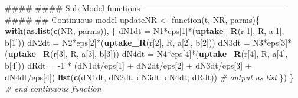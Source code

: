 \documentclass[11pt,]{article}
\newenvironment{Shaded}{\begin{snugshade}}{\end{snugshade}}
\newcommand{\KeywordTok}[1]{\textcolor[rgb]{0.13,0.29,0.53}{\textbf{{#1}}}}
\newcommand{\DecValTok}[1]{\textcolor[rgb]{0.00,0.00,0.81}{{#1}}}
\newcommand{\StringTok}[1]{\textcolor[rgb]{0.31,0.60,0.02}{{#1}}}
\newcommand{\CommentTok}[1]{\textcolor[rgb]{0.56,0.35,0.01}{\textit{{#1}}}}
\newcommand{\NormalTok}[1]{{#1}}
\begin{document}
\begin{Shaded}
\begin{Highlighting}[]
  
  \NormalTok{####}
  \NormalTok{####  Sub-Model functions ----------------------------------------------------}
  \NormalTok{####}
  \NormalTok{## Continuous model}
  \NormalTok{updateNR <-}\StringTok{ }\NormalTok{function(t, NR, parms)\{}
    \KeywordTok{with}\NormalTok{(}\KeywordTok{as.list}\NormalTok{(}\KeywordTok{c}\NormalTok{(NR, parms)), \{}
      \NormalTok{dN1dt =}\StringTok{ }\NormalTok{N1*eps[}\DecValTok{1}\NormalTok{]*(}\KeywordTok{uptake_R}\NormalTok{(r[}\DecValTok{1}\NormalTok{], R, a[}\DecValTok{1}\NormalTok{], b[}\DecValTok{1}\NormalTok{]))}
      \NormalTok{dN2dt =}\StringTok{ }\NormalTok{N2*eps[}\DecValTok{2}\NormalTok{]*(}\KeywordTok{uptake_R}\NormalTok{(r[}\DecValTok{2}\NormalTok{], R, a[}\DecValTok{2}\NormalTok{], b[}\DecValTok{2}\NormalTok{]))}
      \NormalTok{dN3dt =}\StringTok{ }\NormalTok{N3*eps[}\DecValTok{3}\NormalTok{]*(}\KeywordTok{uptake_R}\NormalTok{(r[}\DecValTok{3}\NormalTok{], R, a[}\DecValTok{3}\NormalTok{], b[}\DecValTok{3}\NormalTok{]))}
      \NormalTok{dN4dt =}\StringTok{ }\NormalTok{N4*eps[}\DecValTok{4}\NormalTok{]*(}\KeywordTok{uptake_R}\NormalTok{(r[}\DecValTok{4}\NormalTok{], R, a[}\DecValTok{4}\NormalTok{], b[}\DecValTok{4}\NormalTok{]))}
      \NormalTok{dRdt  =}\StringTok{ }\NormalTok{-}\DecValTok{1} \NormalTok{*}\StringTok{ }\NormalTok{(dN1dt/eps[}\DecValTok{1}\NormalTok{] +}\StringTok{ }\NormalTok{dN2dt/eps[}\DecValTok{2}\NormalTok{] +}\StringTok{ }\NormalTok{dN3dt/eps[}\DecValTok{3}\NormalTok{] +}\StringTok{ }\NormalTok{dN4dt/eps[}\DecValTok{4}\NormalTok{])}
      \KeywordTok{list}\NormalTok{(}\KeywordTok{c}\NormalTok{(dN1dt, dN2dt, dN3dt, dN4dt, dRdt)) }\CommentTok{# output as list}
    \NormalTok{\})}
  \NormalTok{\} }\CommentTok{# end continuous function}
  

\end{Highlighting}
\end{Shaded}
\end{document}
